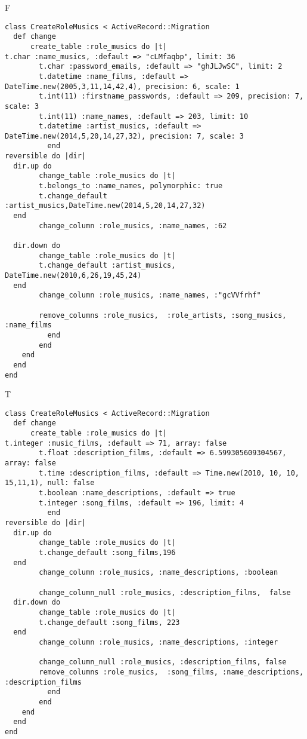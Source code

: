 F
\begin{verbatim}
class CreateRoleMusics < ActiveRecord::Migration
  def change
	  create_table :role_musics do |t|
t.char :name_musics, :default => "cLMfaqbp", limit: 36
		t.char :password_emails, :default => "ghJLJwSC", limit: 2
		t.datetime :name_films, :default => DateTime.new(2005,3,11,14,42,4), precision: 6, scale: 1
		t.int(11) :firstname_passwords, :default => 209, precision: 7, scale: 3
		t.int(11) :name_names, :default => 203, limit: 10
		t.datetime :artist_musics, :default => DateTime.new(2014,5,20,14,27,32), precision: 7, scale: 3
		  end
reversible do |dir|
  dir.up do
		change_table :role_musics do |t|
		t.belongs_to :name_names, polymorphic: true
 		t.change_default :artist_musics,DateTime.new(2014,5,20,14,27,32)
  end
 		change_column :role_musics, :name_names, :62
   
  dir.down do
		change_table :role_musics do |t|
		t.change_default :artist_musics, DateTime.new(2010,6,26,19,45,24)
  end
 		change_column :role_musics, :name_names, :"gcVVfrhf"
   
		remove_columns :role_musics,  :role_artists, :song_musics, :name_films 
	      end
	    end
    end 
  end
end

\end{verbatim}

T
\begin{verbatim}
class CreateRoleMusics < ActiveRecord::Migration
  def change
	  create_table :role_musics do |t|
t.integer :music_films, :default => 71, array: false
		t.float :description_films, :default => 6.599305609304567, array: false
		t.time :description_films, :default => Time.new(2010, 10, 10, 15,11,1), null: false
		t.boolean :name_descriptions, :default => true
		t.integer :song_films, :default => 196, limit: 4
		  end
reversible do |dir|
  dir.up do
		change_table :role_musics do |t|
		t.change_default :song_films,196
  end
 		change_column :role_musics, :name_descriptions, :boolean
   
		change_column_null :role_musics, :description_films,  false
  dir.down do
		change_table :role_musics do |t|
		t.change_default :song_films, 223
  end
 		change_column :role_musics, :name_descriptions, :integer
   
		change_column_null :role_musics, :description_films, false
 		remove_columns :role_musics,  :song_films, :name_descriptions, :description_films 
	      end
	    end
    end 
  end
end

\end{verbatim}

